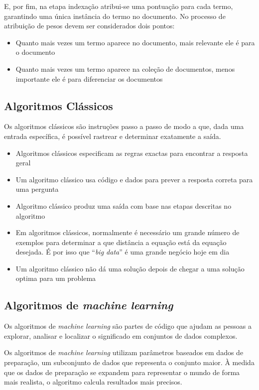 E, por fim, na etapa indexação atribui-se uma pontuação para cada termo, garantindo uma única instância do termo no documento.
No processo de atribuição de pesos devem ser considerados dois pontos:
\begin{itemize}
  \item Quanto mais vezes um termo aparece no documento, mais relevante ele é para o documento
  \item Quanto mais vezes um termo aparece na coleção de documentos, menos importante ele é para diferenciar os documentos
\end{itemize}

\subsection{Algoritmos Clássicos}

Os algoritmos clássicos são instruções passo a passo de modo a que, dada uma entrada específica, é possível rastrear e determinar exatamente a saída.
\begin{itemize}
  \item Algoritmos clássicos especificam as regras exactas para encontrar a resposta geral
  \item Um algoritmo clássico usa código e dados para prever a resposta correta para uma pergunta
  \item Algoritmo clássico produz uma saída com base nas etapas descritas no algoritmo
  \item Em algoritmos clássicos, normalmente é necessário um grande número de exemplos para determinar a que distância a equação está da equação desejada. É por isso que ``\textit{big data}'' é uma grande negócio hoje em dia
  \item Um algoritmo clássico não dá uma solução depois de chegar a uma solução optima para um problema
\end{itemize}

\subsection{Algoritmos de \textit{machine learning}}

Os algoritmos de \textit{machine learning} são partes de código que ajudam as pessoas a explorar, analisar e localizar o significado em conjuntos de dados complexos.

Os algoritmos de \textit{machine learning} utilizam parâmetros baseados em dados de preparação, um subconjunto de dados que representa o conjunto maior.
À medida que os dados de preparação se expandem para representar o mundo de forma mais realista, o algoritmo calcula resultados mais precisos.

